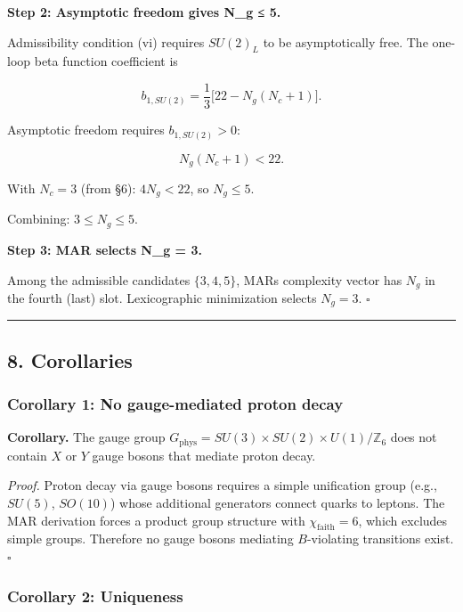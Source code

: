 \textbf{Step 2: Asymptotic freedom gives N\_g ≤ 5.}

Admissibility condition (vi) requires \(SU(2)_L\) to be asymptotically free. The one-loop beta function coefficient is

\[b_{1,SU(2)} = \frac{1}{3}\bigl[22 - N_g(N_c + 1)\bigr].\]

Asymptotic freedom requires \(b_{1,SU(2)} > 0\):

\[N_g(N_c + 1) < 22.\]

With \(N_c = 3\) (from §6): \(4N_g < 22\), so \(N_g \leq 5\).

Combining: \(3 \leq N_g \leq 5\).

\textbf{Step 3: MAR selects N\_g = 3.}

Among the admissible candidates \(\{3, 4, 5\}\), MAR\textquotesingle s complexity vector has \(N_g\) in the fourth (last) slot. Lexicographic minimization selects \(N_g = 3\). \(\square\)

\begin{center}\rule{0.5\linewidth}{0.5pt}\end{center}

\subsection{8. Corollaries}\label{8-corollaries}

\subsubsection{Corollary 1: No gauge-mediated proton decay}\label{corollary-1-no-gauge-mediated-proton-decay}

\textbf{Corollary.} The gauge group \(G_{\mathrm{phys}} = SU(3) \times SU(2) \times U(1)/\mathbb{Z}_6\) does not contain \(X\) or \(Y\) gauge bosons that mediate proton decay.

\emph{Proof.} Proton decay via gauge bosons requires a simple unification group (e.g., \(SU(5)\), \(SO(10)\)) whose additional generators connect quarks to leptons. The MAR derivation forces a product group structure with \(\chi_{\mathrm{faith}} = 6\), which excludes simple groups. Therefore no gauge bosons mediating \(B\)-violating transitions exist. \(\square\)

\subsubsection{Corollary 2: Uniqueness}\label{corollary-2-uniqueness}

